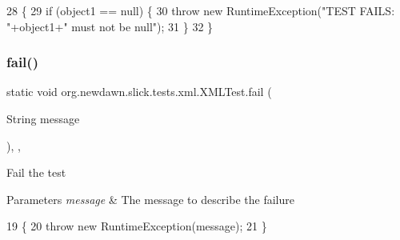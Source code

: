 \begin{DoxyCode}
28                                                       \{
29         \textcolor{keywordflow}{if} (object1 == null) \{
30             \textcolor{keywordflow}{throw} \textcolor{keyword}{new} RuntimeException(\textcolor{stringliteral}{"TEST FAILS: "}+object1+\textcolor{stringliteral}{" must not be null"});
31         \}
32     \}
\end{DoxyCode}
\mbox{\label{classorg_1_1newdawn_1_1slick_1_1tests_1_1xml_1_1_x_m_l_test_a2ebb5c21c202786fb9222bee867ae91c}} 
\subsubsection{\texorpdfstring{fail()}{fail()}}
{\footnotesize\ttfamily static void org.\+newdawn.\+slick.\+tests.\+xml.\+X\+M\+L\+Test.\+fail (\begin{DoxyParamCaption}\item[{String}]{message }\end{DoxyParamCaption})\hspace{0.3cm}{\ttfamily [inline]}, {\ttfamily [static]}, {\ttfamily [private]}}

Fail the test


\begin{DoxyParams}{Parameters}
{\em message} & The message to describe the failure \\
\hline
\end{DoxyParams}

\begin{DoxyCode}
19                                              \{
20         \textcolor{keywordflow}{throw} \textcolor{keyword}{new} RuntimeException(message);
21     \}
\end{DoxyCode}
\mbox{\label{classorg_1_1newdawn_1_1slick_1_1tests_1_1xml_1_1_x_m_l_test_a6fe82594702b83a5d0dd0264b3d34562}} 

